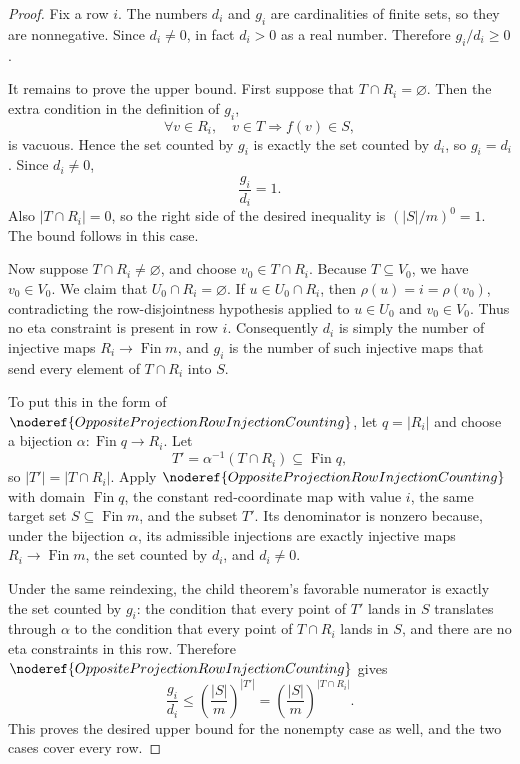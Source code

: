 \begin{proof}
Fix a row \(i\).  The numbers \(d_i\) and \(g_i\) are cardinalities of
finite sets, so they are nonnegative.  Since \(d_i\ne0\), in fact
\(d_i>0\) as a real number.  Therefore \(g_i/d_i\ge0\).

It remains to prove the upper bound.  First suppose that
\(T\cap R_i=\varnothing\).  Then the extra condition in the definition of
\(g_i\),
\[
\forall v\in R_i,\quad v\in T\Rightarrow f(v)\in S,
\]
is vacuous.  Hence the set counted by \(g_i\) is exactly the set counted by
\(d_i\), so \(g_i=d_i\).  Since \(d_i\ne0\),
\[
\frac{g_i}{d_i}=1.
\]
Also \(|T\cap R_i|=0\), so the right side of the desired inequality is
\((|S|/m)^0=1\).  The bound follows in this case.

Now suppose \(T\cap R_i\ne\varnothing\), and choose \(v_0\in T\cap R_i\).
Because \(T\subseteq V_0\), we have \(v_0\in V_0\).  We claim that
\(U_0\cap R_i=\varnothing\).  If \(u\in U_0\cap R_i\), then
\(\rho(u)=i=\rho(v_0)\), contradicting the row-disjointness hypothesis
applied to \(u\in U_0\) and \(v_0\in V_0\).  Thus no eta constraint is
present in row \(i\).  Consequently \(d_i\) is simply the number of
injective maps \(R_i\to\operatorname{Fin}m\), and \(g_i\) is the number of
such injective maps that send every element of \(T\cap R_i\) into \(S\).

To put this in the form of \(\noderef{OppositeProjectionRowInjectionCounting}\),
let \(q=|R_i|\) and choose a bijection
\(\alpha:\operatorname{Fin}q\to R_i\).  Let
\[
T'=\alpha^{-1}(T\cap R_i)\subseteq \operatorname{Fin}q,
\]
so \(|T'|=|T\cap R_i|\).  Apply
\(\noderef{OppositeProjectionRowInjectionCounting}\) with domain
\(\operatorname{Fin}q\), the constant red-coordinate map with value \(i\),
the same target set \(S\subseteq\operatorname{Fin}m\), and the subset
\(T'\).  Its denominator is nonzero because, under the bijection
\(\alpha\), its admissible injections are exactly injective maps
\(R_i\to\operatorname{Fin}m\), the set counted by \(d_i\), and \(d_i\ne0\).

Under the same reindexing, the child theorem's favorable numerator is
exactly the set counted by \(g_i\): the condition that every point of
\(T'\) lands in \(S\) translates through \(\alpha\) to the condition that
every point of \(T\cap R_i\) lands in \(S\), and there are no eta
constraints in this row.  Therefore
\(\noderef{OppositeProjectionRowInjectionCounting}\) gives
\[
\frac{g_i}{d_i}\le
\left(\frac{|S|}{m}\right)^{|T'|}
=\left(\frac{|S|}{m}\right)^{|T\cap R_i|}.
\]
This proves the desired upper bound for the nonempty case as well, and the
two cases cover every row.
\end{proof}

